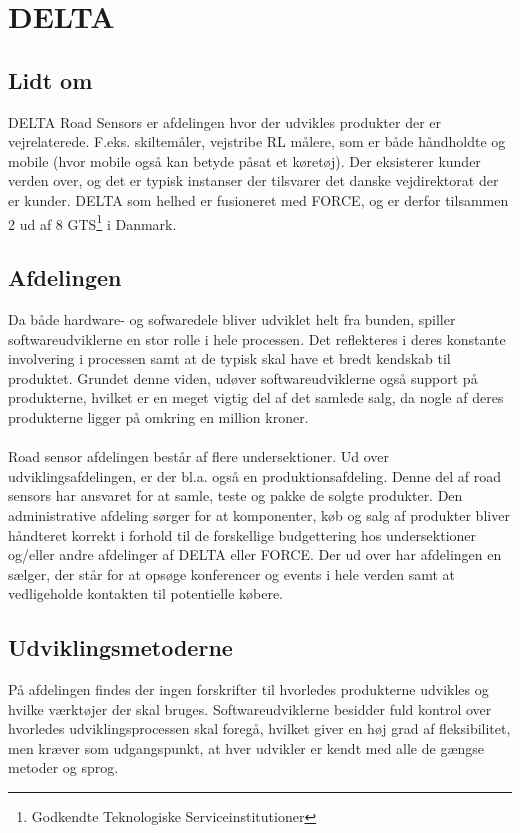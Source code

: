 \section{DELTA}

\subsection{Lidt om}
DELTA Road Sensors er afdelingen hvor der udvikles produkter der er vejrelaterede. F.eks. skiltemåler, vejstribe RL målere, som er både håndholdte og mobile (hvor mobile også kan betyde påsat et køretøj). Der eksisterer kunder verden over, og det er typisk instanser der tilsvarer det danske vejdirektorat der er kunder. DELTA som helhed er fusioneret med FORCE, og er derfor tilsammen 2 ud af 8 GTS\footnote{Godkendte Teknologiske Serviceinstitutioner} i Danmark.

\subsection{Afdelingen}
Da både hardware- og sofwaredele bliver udviklet helt fra bunden, spiller softwareudviklerne en stor rolle i hele processen. Det reflekteres i deres konstante involvering i processen samt at de typisk skal have et bredt kendskab til produktet. Grundet denne viden, udøver softwareudviklerne også support på produkterne, hvilket er en meget vigtig del af det samlede salg, da nogle af deres produkterne ligger på omkring en million kroner.\\
\\
Road sensor afdelingen består af flere undersektioner. Ud over udviklingsafdelingen, er der bl.a. også en produktionsafdeling. Denne del af road sensors har ansvaret for at samle, teste og pakke de solgte produkter. Den administrative afdeling sørger for at komponenter, køb og salg af produkter bliver håndteret korrekt i forhold til de forskellige budgettering hos undersektioner og/eller andre afdelinger af DELTA eller FORCE. Der ud over har afdelingen en sælger, der står for at opsøge konferencer og events i hele verden samt at vedligeholde kontakten til potentielle købere.

\subsection{Udviklingsmetoderne}
På afdelingen findes der ingen forskrifter til hvorledes produkterne udvikles og hvilke værktøjer der skal bruges. Softwareudviklerne besidder fuld kontrol over hvorledes udviklingsprocessen skal foregå, hvilket giver en høj grad af fleksibilitet, men kræver som udgangspunkt, at hver udvikler er kendt med alle de gængse metoder og sprog.

